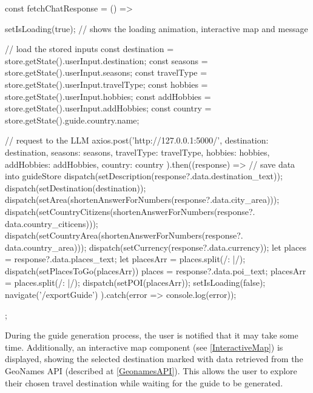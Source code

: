 \documentclass[english,notitlepage,smartquotes]{hgbreport}
\begin{document}
\begin{JsCode}
	const fetchChatResponse = () => {
		setIsLoading(true); // shows the loading animation, interactive map and message
		
		// load the stored inputs
		const destination = store.getState().userInput.destination;
		const seasons = store.getState().userInput.seasons;
		const travelType = store.getState().userInput.travelType;
		const hobbies = store.getState().userInput.hobbies;
		const addHobbies = store.getState().userInput.addHobbies;
		const country = store.getState().guide.country.name;
		
		// request to the LLM
		axios.post('http://127.0.0.1:5000/', {
			destination: destination,
			seasons: seasons,
			travelType: travelType,
			hobbies: hobbies,
			addHobbies: addHobbies,
			country: country
		}).then((response) => {
			// save data into guideStore
			dispatch(setDescription(response?.data.destination_text));
			dispatch(setDestination(destination));
			dispatch(setArea(shortenAnswerForNumbers(response?.data.city_area)));
			dispatch(setCountryCitizens(shortenAnswerForNumbers(response?.
				data.country_citicens)));
			dispatch(setCountryArea(shortenAnswerForNumbers(response?.
				data.country_area)));
			dispatch(setCurrency(response?.data.currency));
			let places = response?.data.places_text;
			let placesArr = places.split(/: |\n\n/);
			dispatch(setPlacesToGo(placesArr))
			places = response?.data.poi_text;
			placesArr = places.split(/: |\n\n/);
			dispatch(setPOI(placesArr));
			setIsLoading(false);
			navigate('/exportGuide')
		}).catch(error => console.log(error));
	};
\end{JsCode}

During the guide generation process, the user is notified that it may take some time. Additionally, an interactive map component (see \ref{InteractiveMap}) is displayed, showing the selected destination marked with data retrieved from the GeoNames API (described at \ref{GeonamesAPI}). This allows the user to explore their chosen travel destination while waiting for the guide to be generated.
\end{document}
